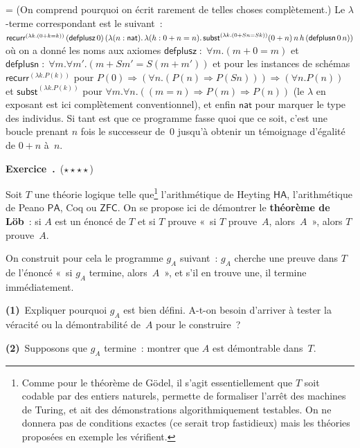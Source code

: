 \documentclass[12pt,a4paper]{article}
\theoremstyle{definition}
\newcommand\exercice{%
\refstepcounter{comcnt}\bigskip\noindent\textbf{Exercice~\thecomcnt.}}
\newif\ifcorrige
\newenvironment{corrige}%
{\ifcorrige\relax\else\setbox0=\vbox\bgroup\fi%
\smallbreak\footnotesize\noindent{\underbar{\textit{Corrigé.}}\quad}}
{{\hbox{}\nobreak\hfill\checkmark}%
\ifcorrige\relax\else\egroup\fi\par}
\begin{document}
\begin{corrige}
(On comprend pourquoi on écrit rarement de telles choses
complètement.)  Le $\lambda$-terme correspondant est le suivant :
$\mathsf{recurr}^{(\lambda k.(0+k=k))}\penalty500\,
(\mathsf{defplusz}\,0)\penalty0\, (\lambda(n:\mathsf{nat}).\,
\lambda(h:0+n=n).\penalty500\, \mathsf{subst}^{(\lambda
  k.(0+Sn=Sk))}(0+n)\,n\,h\penalty500\,(\mathsf{defplusn}\,0\,n))$ où
on a donné les noms aux axiomes $\mathsf{defplusz} \; : \; \forall
m.(m+0 = m)$ et $\mathsf{defplusn} \; : \; \forall m.\forall m'.(m+Sm'
= S(m+m'))$ et pour les instances de schémas
$\mathsf{recurr}^{(\lambda k. P(k))}$ pour $P(0) \Rightarrow (\forall
n.(P(n)\Rightarrow P(Sn))) \Rightarrow (\forall n.P(n))$ et
$\mathsf{subst}^{(\lambda k. P(k))}$ pour $\forall m.\forall n.((m=n)
\Rightarrow P(m) \Rightarrow P(n))$ (le $\lambda$ en exposant est ici
complètement conventionnel), et enfin $\mathsf{nat}$ pour marquer le
type des individus.  Si tant est que ce programme fasse quoi que ce
soit, c'est une boucle prenant $n$ fois le successeur de $0$ jusqu'à
obtenir un témoignage d'égalité de $0+n$ à $n$.
\end{corrige}

%

\exercice\label{exercise-loebs-theorem}\ (${\star}{\star}{\star}{\star}$)\par\nobreak

Soit $T$ une théorie logique telle
que\footnote{\label{footnote-goedelian-theory}Comme pour le théorème
de Gödel, il s'agit essentiellement que $T$ soit codable par des
entiers naturels, permette de formaliser l'arrêt des machines de
Turing, et ait des démonstrations algorithmiquement testables.  On ne
donnera pas de conditions exactes (ce serait trop fastidieux) mais les
théories proposées en exemple les vérifient.}  l'arithmétique de
Heyting $\mathsf{HA}$, l'arithmétique de Peano $\mathsf{PA}$, Coq ou
$\mathsf{ZFC}$.  On se propose ici de démontrer le \textbf{théorème de
  Löb} : si $A$ est un énoncé de $T$ et si $T$ prouve « si $T$
prouve $A$, alors $A$ », alors $T$ prouve $A$.

On construit pour cela le programme $g_A$ suivant : $g_A$ cherche une
preuve dans $T$ de l'énoncé « si $g_A$ termine, alors $A$ », et s'il
en trouve une, il termine immédiatement.

\textbf{(1)} Expliquer pourquoi $g_A$ est bien défini.  A-t-on besoin
d'arriver à tester la véracité ou la démontrabilité de $A$ pour le
construire ?

\textbf{(2)} Supposons que $g_A$ termine : montrer que $A$ est
démontrable dans $T$.
\end{document}
